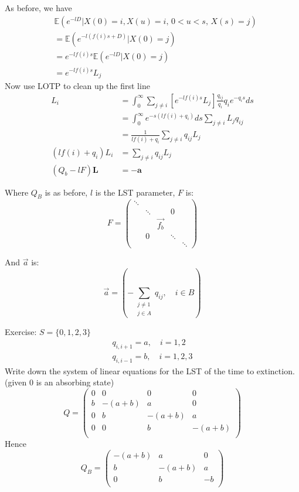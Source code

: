 \documentclass{/home/janmebows/Documents/LatexTemplates/myassignment}
\begin{document}
As before, we have
\begin{align*}
&\mathbb{E}\left(e^{-lD} | X(0) = i, X(u) = i , \, 0<u<s, \, X(s) = j\right)    \\
&= \mathbb{E}\left(e^{-l(f(i)s + D)} | X(0) = j\right)\\
&= e^{-lf(i)s}\mathbb{E}\left(e^{-lD} | X(0) = j\right)\\
&= e^{-lf(i)s} L_j
\end{align*}
Now use LOTP to clean up the first line
\begin{align*}
    L_i &= \int_0^\infty \sum_{j\neq i} \left[e^{-lf(i)s} L_j\right] \frac{q_{ij}}{q_i} q_i e^{-q_is} ds\\
    &=\int_0^\infty  e^{-s(lf(i)+q_i)} ds\sum_{j\neq i}L_j q_{ij} \\
    &= \frac{1}{l f(i)+ q_i} \sum_{j\neq i} q_{ij} L_j\\
    (l f(i) + q_i) L_i &= \sum_{j\neq i} q_{ij} L_j\\
    (Q_b - lF)\mathbf{L} &= - \mathbf{a}
\end{align*}

Where $Q_B$ is as before, $l$ is the LST parameter, $F$ is:
\[F = \begin{pmatrix}
    \ddots & \\
    &\ddots&&0\\
    &&\vec{f_b}&&\\
    &0&&\ddots\\
    &&&&\ddots 
\end{pmatrix}\]

And $\vec{a}$ is:
\[\vec a = \left(- \sum_{\substack{j\neq 1\\ j\in A}} q_{ij}, \quad i\in B\right)\]

Exercise:
$S = \{0,1,2,3\}$
\begin{align*}
    q_{i,i+1} = a,\quad i=1,2\\
    q_{i,i-1} = b,\quad i=1,2,3
\end{align*}
Write down the system of linear equations for the LST of the time to extinction. (given 0 is an absorbing state)
\[Q = \begin{pmatrix}
    0&0&0&0\\
    b & -(a+b) & a & 0\\
    0&b & -(a+b) & a\\
    0&0&b & -(a+b)\\
\end{pmatrix}\]
Hence
\[Q_B = \begin{pmatrix}
    -(a+b) & a & 0\\
    b & -(a+b) & a\\
    0&b & -b\\
\end{pmatrix}\]
\end{document}
